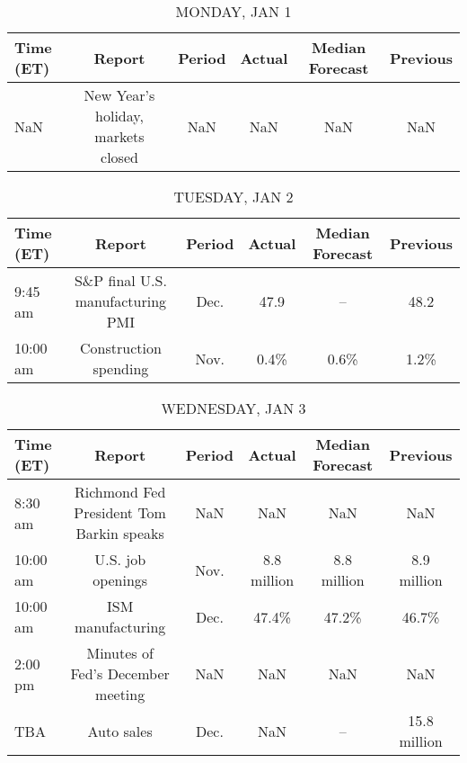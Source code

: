 \documentclass{article}%
\begin{document}
%
\normalsize%


\begin{table}[htbp]%
\caption{MONDAY, JAN 1}%
\centering%
\begin{adjustbox}{width=1\textwidth}%
\begin{tabular}{lccccc}
\toprule
Time (ET) &                             Report & Period & Actual & Median Forecast & Previous \\
\midrule
      NaN & New Year's holiday, markets closed &    NaN &    NaN &             NaN &      NaN \\
\bottomrule
\end{tabular}
%
\end{adjustbox}%
\end{table}

%


\begin{table}[htbp]%
\caption{TUESDAY, JAN 2}%
\centering%
\begin{adjustbox}{width=1\textwidth}%
\begin{tabular}{lccccc}
\toprule
Time (ET) &                           Report & Period & Actual & Median Forecast & Previous \\
\midrule
  9:45 am & S\&P final U.S. manufacturing PMI &   Dec. &   47.9 &              -- &     48.2 \\
 10:00 am &            Construction spending &   Nov. &   0.4\% &            0.6\% &     1.2\% \\
\bottomrule
\end{tabular}
%
\end{adjustbox}%
\end{table}

%


\begin{table}[htbp]%
\caption{WEDNESDAY, JAN 3}%
\centering%
\begin{adjustbox}{width=1\textwidth}%
\begin{tabular}{lccccc}
\toprule
Time (ET) &                                   Report & Period &      Actual & Median Forecast &     Previous \\
\midrule
  8:30 am & Richmond Fed President Tom Barkin speaks &    NaN &         NaN &             NaN &          NaN \\
 10:00 am &                        U.S. job openings &   Nov. & 8.8 million &     8.8 million &  8.9 million \\
 10:00 am &                        ISM manufacturing &   Dec. &       47.4\% &           47.2\% &        46.7\% \\
  2:00 pm &        Minutes of Fed's December meeting &    NaN &         NaN &             NaN &          NaN \\
      TBA &                               Auto sales &   Dec. &         NaN &              -- & 15.8 million \\
\bottomrule
\end{tabular}
%
\end{adjustbox}%
\end{table}
\end{document}
